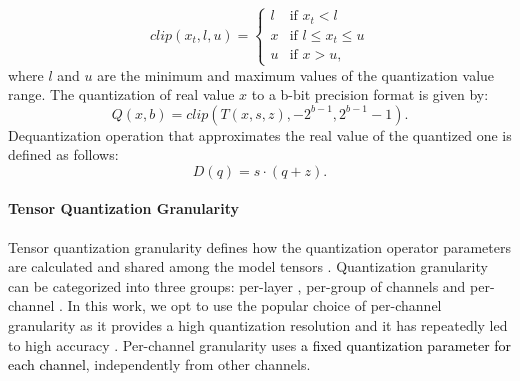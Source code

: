 \documentclass[a4paper,conference]{IEEEtran}
\begin{document}
\vspace{-1mm}
\begin{equation}
    clip(x_t,l , u)= 
    \begin{cases}
    l &\text{if }  x_t < l \\
    x &\text{if }  l \leq x_t \leq u \\
    u &\text{if }  x > u,
    \end{cases}
\end{equation}
\vspace{-1mm}
where $l$ and $u$ are the minimum and maximum values of the quantization value range. 
The quantization of real value $x$ to a b-bit precision format is given by:
\vspace{-1mm}
\begin{equation}
    Q(x, b)= clip(T(x, s, z), -2^{b-1}, 2^{b-1}-1 ).
\end{equation}
Dequantization operation that approximates the real value of the quantized one is defined as follows:
\vspace{-1mm}
\begin{equation}
    D(q) = s \cdot (q + z).
\end{equation}
\vspace{-1mm}
\paragraph{Tensor Quantization Granularity}
Tensor quantization granularity defines how the quantization operator parameters are calculated and shared among the model tensors \cite{DBLP:journals/corr/abs-2103-13630}.
Quantization granularity \cite{DBLP:journals/corr/abs-2103-13630} can be categorized into three groups: per-layer \cite{DBLP:journals/corr/abs-1806-08342}, per-group of channels \cite{DBLP:conf/aaai/ShenDYMYGMK20}  and per-channel \cite{DBLP:conf/fpga/0001WDGCLWKW21,DBLP:conf/cvpr/JacobKCZTHAK18,DBLP:journals/corr/abs-1806-08342,DBLP:conf/eccv/ZhangYYH18}. In this work, we opt to use the popular choice of per-channel granularity as it provides a high quantization resolution and it has repeatedly led to high accuracy \cite{DBLP:conf/fpga/0001WDGCLWKW21,DBLP:conf/cvpr/JacobKCZTHAK18,DBLP:journals/corr/abs-1806-08342,DBLP:conf/eccv/ZhangYYH18}.  
Per-channel granularity uses \textcolor{black}{a fixed quantization parameter for each channel}, independently from other channels.
\end{document}
